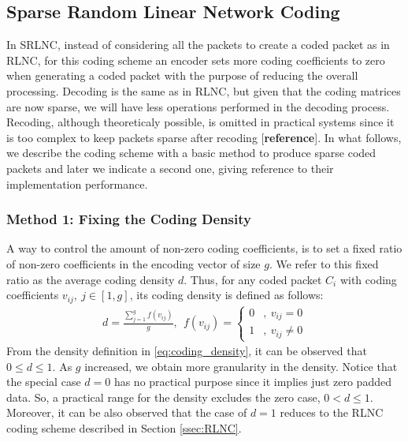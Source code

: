 \subsection{Sparse Random Linear Network Coding}

In \ac{SRLNC}, instead of considering all the packets to create a coded
packet as in \ac{RLNC}, for this coding scheme an encoder sets more
coding coefficients to zero when generating a coded packet with the purpose
of reducing the overall processing. Decoding is the same as in \ac{RLNC}, but
given that the coding matrices are now sparse, we will have less operations
performed in the decoding process. Recoding, although theoreticaly possible,
is omitted in practical systems since it is too complex to keep packets sparse
after recoding [\textbf{reference}]. In what follows, we
describe the coding scheme with a basic method to produce sparse coded
packets and later we indicate a second one, giving reference to their
implementation performance.

\subsubsection{Method 1: Fixing the Coding Density}
A way to control the amount of non-zero coding coefficients, is to set a
fixed ratio of non-zero coefficients in the encoding vector of size $g$. We
refer to this fixed ratio as the average coding density $d$. Thus, for any
coded packet $C_i$ with coding coefficients $v_{ij},\ j \in [1,g]$, its
coding density is defined as follows:
%
\begin{align}
\label{eq:coding_density}
d = \frac{\sum_{j=1}^{g} f(v_{ij})}{g},\ \
    f(v_{ij}) =
    \begin{cases}
        0 &,\ v_{ij} = 0 \\
        1 &,\ v_{ij} \neq 0
    \end{cases}
\end{align}
%
From the density definition in \eqref{eq:coding_density}, it can be
observed that $0 \leq d \leq 1$. As $g$ increased, we obtain more
granularity in the density. Notice that the special case $d = 0$ has no
practical purpose since it implies just zero padded data. So, a practical
range for the density excludes the zero case, $0 < d \leq 1$. Moreover,
it can be also observed that the case of $d = 1$ reduces to the \ac{RLNC}
coding scheme described in Section \ref{ssec:RLNC}.

